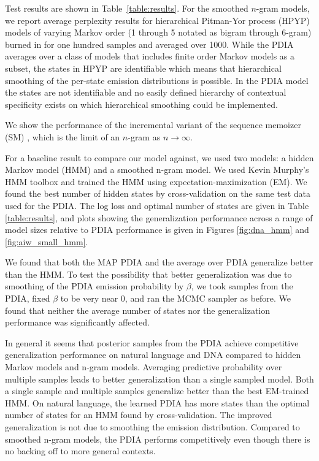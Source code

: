 Test results are shown in Table~\ref{table:results}.  
For the smoothed $n$-gram models, we report average perplexity results for hierarchical Pitman-Yor process (HPYP) \cite{Teh2006} models of varying Markov order (1 through 5 notated as bigram through 6-gram) burned in for one hundred samples and averaged over 1000.  While the PDIA averages over a  class of models that includes finite order Markov models as a subset, the states in HPYP are identifiable which means that hierarchical smoothing of the per-state emission distributions is possible.  In the PDIA model the states are not identifiable and no easily defined hierarchy of contextual specificity exists on which hierarchical smoothing could be implemented.  


We show the performance of the incremental variant of the sequence memoizer (SM) \cite{Gasthaus2010}, which is the limit of an $n$-gram as $n\rightarrow\infty$.

For a baseline result to compare our model against, we used two models: a hidden Markov model (HMM) and a smoothed n-gram model.  We used Kevin Murphy's HMM toolbox \cite{Murphy} and trained the HMM using expectation-maximization (EM).  We found the best number of hidden states by cross-validation on the same test data used for the PDIA.  The log loss and optimal number of states are given in Table \ref{table:results}, and plots showing the generalization performance across a range of model sizes relative to PDIA performance is given in Figures \ref{fig:dna_hmm} and \ref{fig:aiw_small_hmm}.  

We found that both the MAP PDIA and the average over PDIA generalize better than the HMM.  To test the possibility that better generalization was due to smoothing of the PDIA emission probability by $\beta$, we took samples from the PDIA, fixed $\beta$ to be very near 0, and ran the MCMC sampler as before.  We found that neither the average number of states nor the generalization performance was significantly affected.

In general it seems that posterior samples from the PDIA achieve competitive generalization performance on natural language and DNA compared to hidden Markov models and n-gram models.  Averaging predictive probability over multiple samples leads to better generalization than a single sampled model.  Both a single sample and multiple samples generalize better than the best EM-trained HMM.  On natural language, the learned PDIA has more states than the optimal number of states for an HMM found by cross-validation.  The improved generalization is not due to smoothing the emission distribution.  Compared to smoothed n-gram models, the PDIA performs competitively even though there is no backing off to more general contexts.



